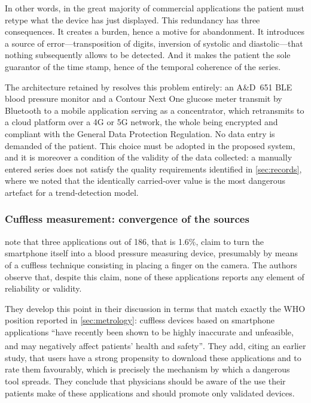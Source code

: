 \documentclass[12pt,a4paper,oneside]{report}
\newcommand{\bq}[1]{``#1''\textsuperscript{\dag}}
\begin{document}
In other words, in the great majority of commercial applications the patient must retype what the device has just displayed. This redundancy has three consequences. It creates a burden, hence a motive for abandonment. It introduces a source of error---transposition of digits, inversion of systolic and diastolic---that nothing subsequently allows to be detected. And it makes the patient the sole guarantor of the time stamp, hence of the temporal coherence of the series.

The architecture retained by \textcite{mihevc2025} resolves this problem entirely: an A\&D~651 BLE blood pressure monitor and a Contour Next One glucose meter transmit by Bluetooth to a mobile application serving as a concentrator, which retransmits to a cloud platform over a 4G or 5G network, the whole being encrypted and compliant with the General Data Protection Regulation. No data entry is demanded of the patient. This choice must be adopted in the proposed system, and it is moreover a condition of the validity of the data collected: a manually entered series does not satisfy the quality requirements identified in \cref{sec:records}, where we noted that the identically carried-over value is the most dangerous artefact for a trend-detection model.

\subsubsection{Cuffless measurement: convergence of the sources}\label{sec:cuffless}

\textcite{alessa2019} note that three applications out of 186, that is 1.6\%, claim to turn the smartphone itself into a blood pressure measuring device, presumably by means of a cuffless technique consisting in placing a finger on the camera. The authors observe that, despite this claim, none of these applications reports any element of reliability or validity.

They develop this point in their discussion in terms that match exactly the WHO position reported in \cref{sec:metrology}: cuffless devices based on smartphone applications \bq{have recently been shown to be highly inaccurate and unfeasible, and may negatively affect patients' health and safety}. They add, citing an earlier study, that users have a strong propensity to download these applications and to rate them favourably, which is precisely the mechanism by which a dangerous tool spreads. They conclude that physicians should be aware of the use their patients make of these applications and should promote only validated devices.
\end{document}
